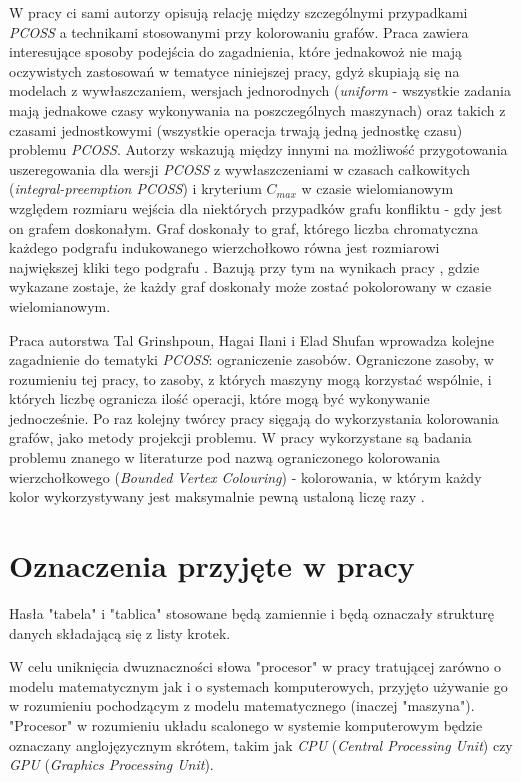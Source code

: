 \documentclass[brudnopis]{xmgr}
\begin{document}
W pracy \cite{ilani2016partially} ci sami autorzy opisują relację między szczególnymi przypadkami \emph{PCOSS} a technikami stosowanymi przy kolorowaniu grafów. Praca zawiera interesujące sposoby podejścia do zagadnienia, które jednakowoż nie mają oczywistych zastosowań w tematyce niniejszej pracy, gdyż skupiają się na modelach z wywłaszczaniem, wersjach jednorodnych (\emph{uniform} - wszystkie zadania mają jednakowe czasy wykonywania na poszczególnych maszynach) oraz takich z czasami jednostkowymi (wszystkie operacja trwają jedną jednostkę czasu) problemu \emph{PCOSS}. Autorzy wskazują między innymi na możliwość przygotowania uszeregowania dla wersji \emph{PCOSS} z wywłaszczeniami w czasach całkowitych (\emph{integral-preemption PCOSS}) i kryterium $C_{max}$ w czasie wielomianowym względem rozmiaru wejścia dla niektórych przypadków grafu konfliktu - gdy jest on grafem doskonałym. Graf doskonały to graf, którego liczba chromatyczna każdego podgrafu indukowanego wierzchołkowo równa jest rozmiarowi największej kliki tego podgrafu \cite{diestel2010graph}. Bazują przy tym na wynikach pracy \cite{grotschel1984polynomial}, gdzie wykazane zostaje, że każdy graf doskonały może zostać pokolorowany w czasie wielomianowym.
\medskip

Praca \cite{ilani2018partially} autorstwa Tal Grinshpoun, Hagai Ilani i Elad Shufan wprowadza kolejne zagadnienie do tematyki \emph{PCOSS}: ograniczenie zasobów. Ograniczone zasoby, w rozumieniu tej pracy, to zasoby, z których maszyny mogą korzystać wspólnie, i których liczbę ogranicza ilość operacji, które mogą być wykonywanie jednocześnie. Po raz kolejny twórcy pracy sięgają do wykorzystania kolorowania grafów, jako metody projekcji problemu. W pracy wykorzystane są badania problemu znanego w literaturze pod nazwą ograniczonego kolorowania wierzchołkowego (\emph{Bounded Vertex Colouring}) - kolorowania, w którym każdy kolor wykorzystywany jest maksymalnie pewną ustaloną liczę razy \cite{hansen1993bounded}.

\section{Oznaczenia przyjęte w pracy}

Hasła "tabela" i "tablica" stosowane będą zamiennie i będą oznaczały strukturę danych składającą się z listy krotek. 
\medskip

W celu uniknięcia dwuznaczności słowa "procesor" w pracy tratującej zarówno o modelu matematycznym jak i o systemach komputerowych, przyjęto używanie go w rozumieniu pochodzącym z modelu matematycznego (inaczej "maszyna").
"Procesor" w rozumieniu układu scalonego w systemie komputerowym będzie oznaczany anglojęzycznym skrótem, takim jak \emph{CPU} (\emph{Central Processing Unit}) czy \emph{GPU} (\emph{Graphics Processing Unit}).
\medskip
\end{document}
